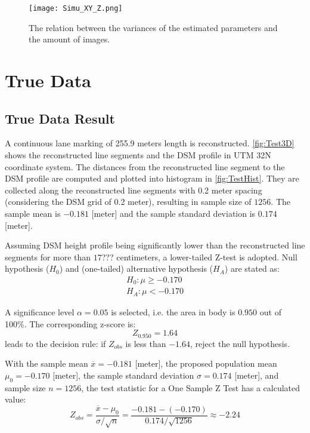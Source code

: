 \begin{figure}
  \centering
  \texttt{[image: Simu\_XY\_Z.png]}
  \caption{\small The relation between the variances of the estimated parameters and the amount of images.}
  \label{fig:SimuSigmaxx}
\end{figure}

\clearpage
\section{True Data}
\label{sec:truedata}

\subsection{True Data Result}
\label{subsec:trueresult}

A continuous lane marking of 255.9 meters length is reconstructed. \cref{fig:Test3D} shows the reconstructed line segments and the DSM profile in UTM 32N coordinate system. The distances from the reconstructed line segment to the DSM profile are computed and plotted into histogram in \cref{fig:TestHist}. They are collected along the reconstructed line segments with 0.2 meter spacing (considering the DSM grid of 0.2 meter), resulting in sample size of $1256$. The sample mean is $-0.181$ [meter] and the sample standard deviation is $0.174$ [meter]. %

Assuming DSM height profile being significantly lower than the reconstructed line segments for more than $17$??? centimeters, a lower-tailed Z-test is adopted. Null hypothesis ($H_0$) and (one-tailed) alternative hypothesis ($H_A$) are stated as:
\begin{equation*}
\begin{split}
H_0: \mu\geq-0.170\\
H_A: \mu<-0.170
\end{split}
\end{equation*}

A significance level $\alpha=0.05$ is selected, i.e. the area in body is $0.950$ out of 100\%. The corresponding z-score is:
\begin{equation*}
Z_{0.950}=1.64
\end{equation*}
leads to the decision rule: if $Z_{obs}$ is less than $-1.64$, reject the null hypothesis.

With the sample mean $\overline{x}=-0.181$ [meter],
the proposed population mean $\mu_0=-0.170$ [meter],
the sample standard deviation $\sigma=0.174$ [meter],
and sample size $n=1256$, the test statistic for a One Sample Z Test has a calculated value:
\begin{equation*}
Z_{obs} = \frac{\overline{x}-\mu_0}{\sigma/\sqrt{n}}=\frac{-0.181-(-0.170)}{0.174/\sqrt{1256}}\approx-2.24
\end{equation*}

